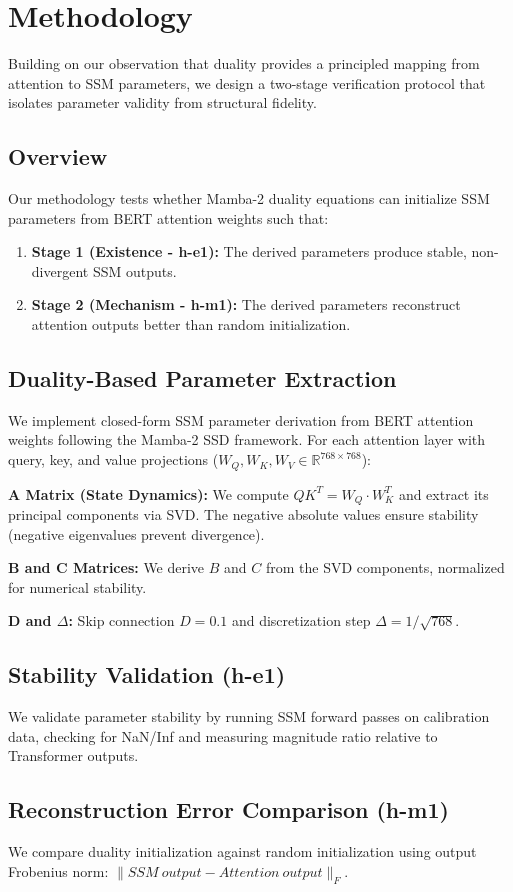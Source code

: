 \section{Methodology}
\label{sec:methodology}

Building on our observation that duality provides a principled mapping from attention to SSM parameters, we design a two-stage verification protocol that isolates parameter validity from structural fidelity.

\subsection{Overview}

Our methodology tests whether Mamba-2 duality equations can initialize SSM parameters from BERT attention weights such that:

\begin{enumerate}
    \item \textbf{Stage 1 (Existence - h-e1):} The derived parameters produce stable, non-divergent SSM outputs.
    \item \textbf{Stage 2 (Mechanism - h-m1):} The derived parameters reconstruct attention outputs better than random initialization.
\end{enumerate}

\subsection{Duality-Based Parameter Extraction}

We implement closed-form SSM parameter derivation from BERT attention weights following the Mamba-2 SSD framework. For each attention layer with query, key, and value projections ($W_Q, W_K, W_V \in \mathbb{R}^{768 \times 768}$):

\textbf{A Matrix (State Dynamics):} We compute $QK^T = W_Q \cdot W_K^T$ and extract its principal components via SVD. The negative absolute values ensure stability (negative eigenvalues prevent divergence).

\textbf{B and C Matrices:} We derive $B$ and $C$ from the SVD components, normalized for numerical stability.

\textbf{D and $\Delta$:} Skip connection $D = 0.1$ and discretization step $\Delta = 1/\sqrt{768}$.

\subsection{Stability Validation (h-e1)}

We validate parameter stability by running SSM forward passes on calibration data, checking for NaN/Inf and measuring magnitude ratio relative to Transformer outputs.

\subsection{Reconstruction Error Comparison (h-m1)}

We compare duality initialization against random initialization using output Frobenius norm: $\|SSM\ output - Attention\ output\|_F$.
